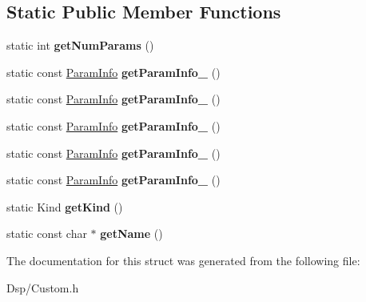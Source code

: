 \subsection*{Static Public Member Functions}
\begin{DoxyCompactItemize}
\item 
\hypertarget{structDsp_1_1Custom_1_1Design_1_1TwoPole_a6ceef93b12fb72cdd2aa6d2cb32ddb00}{static int {\bfseries get\-Num\-Params} ()}\label{structDsp_1_1Custom_1_1Design_1_1TwoPole_a6ceef93b12fb72cdd2aa6d2cb32ddb00}

\item 
\hypertarget{structDsp_1_1Custom_1_1Design_1_1TwoPole_acb253b376186a72f8a2551c5040bf113}{static const \hyperlink{classDsp_1_1ParamInfo}{Param\-Info} {\bfseries get\-Param\-Info\-\_} ()}\label{structDsp_1_1Custom_1_1Design_1_1TwoPole_acb253b376186a72f8a2551c5040bf113}

\item 
\hypertarget{structDsp_1_1Custom_1_1Design_1_1TwoPole_ab6b5f4a65b33121fa94217fe2b0c90fb}{static const \hyperlink{classDsp_1_1ParamInfo}{Param\-Info} {\bfseries get\-Param\-Info\-\_} ()}\label{structDsp_1_1Custom_1_1Design_1_1TwoPole_ab6b5f4a65b33121fa94217fe2b0c90fb}

\item 
\hypertarget{structDsp_1_1Custom_1_1Design_1_1TwoPole_ac35a429ee294ab7c2034406803d27e61}{static const \hyperlink{classDsp_1_1ParamInfo}{Param\-Info} {\bfseries get\-Param\-Info\-\_} ()}\label{structDsp_1_1Custom_1_1Design_1_1TwoPole_ac35a429ee294ab7c2034406803d27e61}

\item 
\hypertarget{structDsp_1_1Custom_1_1Design_1_1TwoPole_a7328aa36fa6470e52378021312e62bb0}{static const \hyperlink{classDsp_1_1ParamInfo}{Param\-Info} {\bfseries get\-Param\-Info\-\_} ()}\label{structDsp_1_1Custom_1_1Design_1_1TwoPole_a7328aa36fa6470e52378021312e62bb0}

\item 
\hypertarget{structDsp_1_1Custom_1_1Design_1_1TwoPole_a3b2b6d779a54ca5d18c4e47b049ddbe1}{static const \hyperlink{classDsp_1_1ParamInfo}{Param\-Info} {\bfseries get\-Param\-Info\-\_} ()}\label{structDsp_1_1Custom_1_1Design_1_1TwoPole_a3b2b6d779a54ca5d18c4e47b049ddbe1}

\item 
\hypertarget{structDsp_1_1Custom_1_1Design_1_1TwoPole_a11ecf572e1735fc8f060189b08559088}{static Kind {\bfseries get\-Kind} ()}\label{structDsp_1_1Custom_1_1Design_1_1TwoPole_a11ecf572e1735fc8f060189b08559088}

\item 
\hypertarget{structDsp_1_1Custom_1_1Design_1_1TwoPole_a280f54f6764c263b9f498eb8a755273d}{static const char $\ast$ {\bfseries get\-Name} ()}\label{structDsp_1_1Custom_1_1Design_1_1TwoPole_a280f54f6764c263b9f498eb8a755273d}

\end{DoxyCompactItemize}


The documentation for this struct was generated from the following file\-:\begin{DoxyCompactItemize}
\item 
Dsp/Custom.\-h\end{DoxyCompactItemize}
